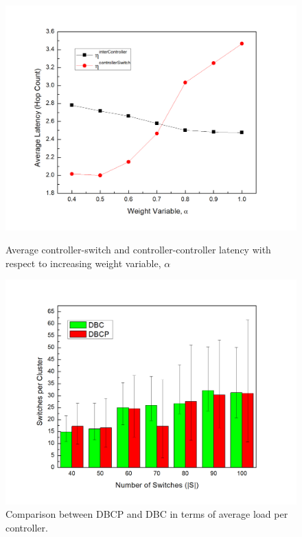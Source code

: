 \documentclass{IEEEtran}
\begin{document}
	\begin{figure}
		\includegraphics[width=\linewidth]{Figures/alphaGraph.jpg}
		\caption{Average controller-switch and controller-controller latency with respect to increasing weight variable, $\alpha$}
		\label{fig:alphaGraph}
		
		\includegraphics[width=\linewidth]{Figures/loadBalance.jpg}
		\caption{Comparison between DBCP and DBC in terms of average load per controller.}
		\label{fig:loadBalance}
	\end{figure}
\end{document}
